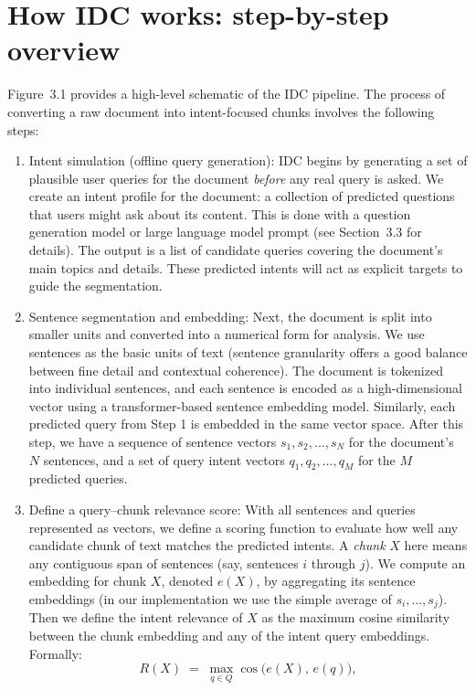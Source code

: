 \documentclass[12pt,a4paper]{report}
\begin{document}
\section{How IDC works: step-by-step overview}

Figure~3.1 provides a high-level schematic of the IDC pipeline. The process of converting a raw document into intent-focused chunks involves the following steps:

\begin{enumerate}
    \item Intent simulation (offline query generation): IDC begins by generating a set of plausible user queries for the document \emph{before} any real query is asked. We create an intent profile for the document: a collection of predicted questions that users might ask about its content. This is done with a question generation model or large language model prompt (see Section~3.3 for details). The output is a list of candidate queries covering the document's main topics and details. These predicted intents will act as explicit targets to guide the segmentation.
    \item Sentence segmentation and embedding: Next, the document is split into smaller units and converted into a numerical form for analysis. We use sentences as the basic units of text (sentence granularity offers a good balance between fine detail and contextual coherence). The document is tokenized into individual sentences, and each sentence is encoded as a high-dimensional vector using a transformer-based sentence embedding model. Similarly, each predicted query from Step 1 is embedded in the same vector space. After this step, we have a sequence of sentence vectors $s_1, s_2, \dots, s_N$ for the document's $N$ sentences, and a set of query intent vectors $q_1, q_2, \dots, q_M$ for the $M$ predicted queries.
    \item Define a query--chunk relevance score: With all sentences and queries represented as vectors, we define a scoring function to evaluate how well any candidate chunk of text matches the predicted intents. A \textit{chunk} $X$ here means any contiguous span of sentences (say, sentences $i$ through $j$). We compute an embedding for chunk $X$, denoted $e(X)$, by aggregating its sentence embeddings (in our implementation we use the simple average of $s_i, \ldots, s_j$). Then we define the intent relevance of $X$ as the maximum cosine similarity between the chunk embedding and any of the intent query embeddings. Formally: 
    \[
       R(X) \;=\; \max_{q \in Q} \cos\!\big(e(X),\, e(q)\big),
\]
\end{enumerate}
\end{document}

